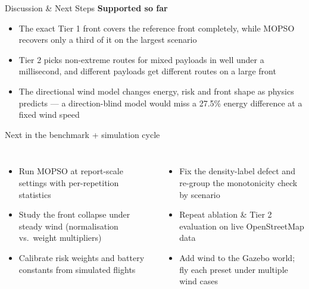 \documentclass[aspectratio=169,11pt]{beamer}
\begin{document}
\begin{frame}{Discussion \& Next Steps}
  \footnotesize
  \textbf{Supported so far}
  \begin{itemize}
    \item The exact Tier 1 front covers the reference front completely, while MOPSO recovers only a third of it on the largest scenario
    \item Tier 2 picks non-extreme routes for mixed payloads in well under a millisecond, and different payloads get different routes on a large front
    \item The directional wind model changes energy, risk and front shape as physics predicts --- a direction-blind model would miss a 27.5\% energy difference at a fixed wind speed
  \end{itemize}
  \vspace{2mm}

  \begin{block}{Next in the benchmark + simulation cycle}
    \begin{columns}[T,onlytextwidth]
        \begin{itemize}
          \item Run MOPSO at report-scale settings with per-repetition statistics
          \item Study the front collapse under steady wind (normalisation vs.\ weight multipliers)
          \item Calibrate risk weights and battery constants from simulated flights
        \end{itemize}
        \begin{itemize}
          \item Fix the density-label defect and re-group the monotonicity check by scenario
          \item Repeat ablation \& Tier 2 evaluation on live OpenStreetMap data
          \item Add wind to the Gazebo world; fly each preset under multiple wind cases
        \end{itemize}
    \end{columns}
  \end{block}
\end{frame}
\end{document}
